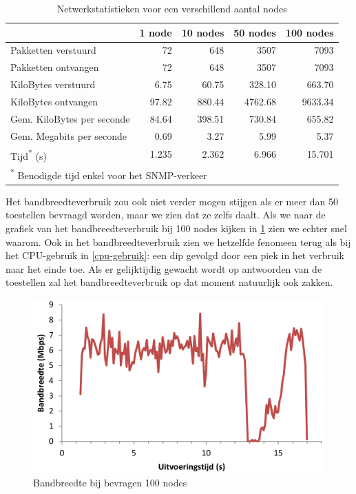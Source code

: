\begin{table}[h]
\centering
\begin{tabular}{@{}lrrrr@{}}
\toprule
                           & 1 node & 10 nodes & 50 nodes & 100 nodes \\ \midrule
Pakketten verstuurd        & 72     & 648      & 3507     & 7093      \\
Pakketten ontvangen        & 72     & 648      & 3507     & 7093      \\
KiloBytes verstuurd        & 6.75   & 60.75    & 328.10   & 663.70    \\
KiloBytes ontvangen        & 97.82  & 880.44   & 4762.68  & 9633.34   \\
Gem. KiloBytes per seconde & 84.64  & 398.51   & 730.84   & 655.82    \\
Gem. Megabits per seconde  & 0.69   & 3.27     & 5.99     & 5.37      \\
Tijd\textsuperscript{*} (s)& 1.235  & 2.362    & 6.966    & 15.701    \\ \midrule[.5pt]
\multicolumn{4}{l}{\textsuperscript{*} \footnotesize{Benodigde tijd enkel voor het SNMP-verkeer}}
\end{tabular}
\caption{Netwerkstatistieken voor een verschillend aantal nodes}
\label{tabel-bandbreedte-aantalnodes}
\end{table}

Het bandbreedteverbruik zou ook niet verder mogen stijgen als er meer dan 50 toestellen bevraagd worden,
maar we zien dat ze zelfs daalt.
Als we naar de grafiek van het bandbreedteverbruik bij 100 nodes kijken in \cref{fig-bandbreedte-100-nodes}
zien we echter snel waarom.
Ook in het bandbreedteverbruik zien we hetzelfde fenomeen terug als bij het CPU-gebruik in \cref{cpu-gebruik}:
een dip gevolgd door een piek in het verbruik naar het einde toe.
Als er gelijktijdig gewacht wordt op antwoorden van de toestellen zal het bandbreedteverbruik op dat moment natuurlijk ook zakken.

\begin{figure}[h]
	\centering
	\includegraphics[scale=0.40]{figures/bandbreedte/bandbreedte-100nodes}
	\caption{Bandbreedte bij bevragen 100 nodes}
	\label{fig-bandbreedte-100-nodes}
\end{figure}

